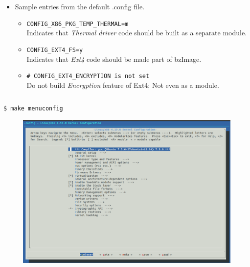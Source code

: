 \documentclass{beamer}
\begin{document}
\begin{frame}[fragile]
  \begin{itemize}
\item Sample entries from the default .config file.
  \begin{itemize}
  \item \texttt{CONFIG\_X86\_PKG\_TEMP\_THERMAL=m} \\
    Indicates that \emph{Thermal driver} code should be built as a separate module.
  \item \texttt{CONFIG\_EXT4\_FS=y} \\
    Indicates that \emph{Ext4} code should be made part of bzImage.
  \item \texttt{\# CONFIG\_EXT4\_ENCRYPTION is not set} \\
    Do not build \emph{Encryption} feature of Ext4; Not even as a module.
  \end{itemize}
\begin{lstlisting}
\end{lstlisting}
\end{itemize}
\end{frame}

\begin{frame}[fragile]
    \begin{lstlisting}
$ make menuconfig
    \end{lstlisting}
  \begin{figure}[h!]
    \centering
    \includegraphics[scale=0.3]{images/make-menuconfig.png}
  \end{figure}
\end{frame}
\end{document}
